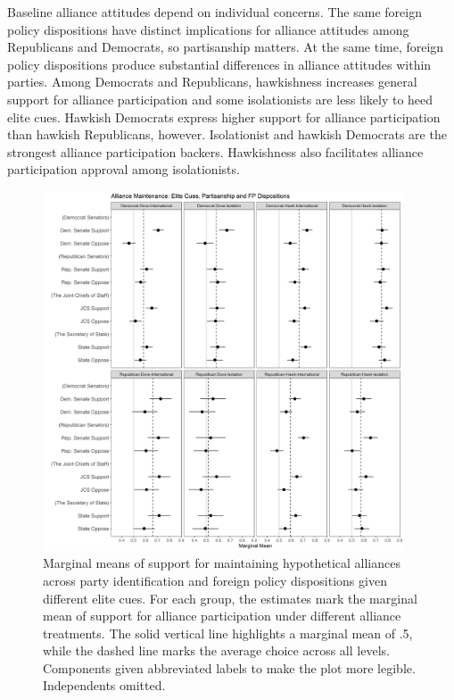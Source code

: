 \documentclass[12pt]{article}
\begin{document}
Baseline alliance attitudes depend on individual concerns. 
The same foreign policy dispositions have distinct implications for alliance attitudes among Republicans and Democrats, so partisanship matters.
At the same time, foreign policy dispositions produce substantial differences in alliance attitudes within parties.  
Among Democrats and Republicans, hawkishness increases general support for alliance participation and some isolationists are less likely to heed elite cues. 
Hawkish Democrats express higher support for alliance participation than hawkish Republicans, however. 
Isolationist and hawkish Democrats are the strongest alliance participation backers. 
Hawkishness also facilitates alliance participation approval among isolationists. 


\begin{figure}
	\centering
		\includegraphics[width=0.95\textwidth]{../figures/party-dispo-main-el.png}
	\caption{Marginal means of support for maintaining hypothetical alliances across party identification and foreign policy dispositions given different elite cues. For each group, the estimates mark the marginal mean of support for alliance participation under different alliance treatments. The solid vertical line highlights a marginal mean of .5, while the dashed line marks the average choice across all levels. Components given abbreviated labels to make the plot more legible. Independents omitted.}
	\label{fig:party-dispo-main-el}
\end{figure}
\end{document}
